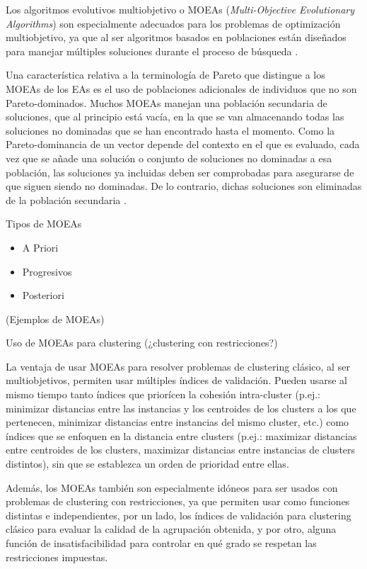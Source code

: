 Los algoritmos evolutivos multiobjetivo o MOEAs (\emph{Multi-Objective Evolutionary Algorithms}) son especialmente adecuados para los problemas de optimización multiobjetivo, ya que al ser algoritmos basados en poblaciones están diseñados para manejar múltiples soluciones durante el proceso de búsqueda \cite{mukhopadhyay2013survey}. 

Una característica relativa a la terminología de Pareto que distingue a los MOEAs de los EAs es el uso de poblaciones adicionales de individuos que no son Pareto-dominados. Muchos MOEAs manejan una población secundaria de soluciones, que al principio está vacía, en la que se van almacenando todas las soluciones no dominadas que se han encontrado hasta el momento. Como la Pareto-dominancia de un vector depende del contexto en el que es evaluado, cada vez que se añade una solución o conjunto de soluciones no dominadas a esa población, las soluciones ya incluidas deben ser comprobadas para asegurarse de que siguen siendo no dominadas. De lo contrario, dichas soluciones son eliminadas de la población secundaria \cite{coello2007evolutionary}.

Tipos de MOEAs

\begin{itemize}
\item A Priori
\item Progresivos
\item Posteriori
\end{itemize}

(Ejemplos de MOEAs)

Uso de MOEAs para clustering (¿clustering con restricciones?)

La ventaja de usar MOEAs para resolver problemas de clustering clásico, al ser multiobjetivos, permiten usar múltiples índices de validación. Pueden usarse al mismo tiempo tanto índices que priorícen la cohesión intra-cluster (p.ej.: minimizar distancias entre las instancias y los centroides de los clusters a los que pertenecen, minimizar distancias entre instancias del mismo cluster, etc.) como índices que se enfoquen en la distancia entre clusters (p.ej.: maximizar distancias entre centroides de los clusters, maximizar distancias entre instancias de clusters distintos), sin que se establezca un orden de prioridad entre ellas.

Además, los MOEAs también son especialmente idóneos para ser usados con problemas de clustering con restricciones, ya que permiten usar como funciones distintas e independientes, por un lado, los índices de validación para clustering clásico para evaluar la calidad de la agrupación obtenida, y por otro, alguna función de insatisfacibilidad para controlar en qué grado se respetan las restricciones impuestas.


